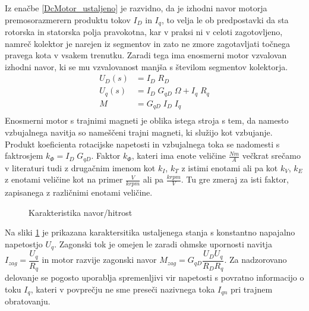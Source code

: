 \documentclass[a4paper,twoside,openright,12pt]{book}
\begin{document}
Iz enačbe \ref{DcMotor_ustaljeno} je razvidno, da je izhodni navor motorja premosorazmerern produktu tokov $I_D$ in $I_q$, to velja le ob predpostavki da sta rotorska in statorska polja pravokotna, kar v praksi ni v celoti zagotovljeno, namreč kolektor je narejen iz segmentov in zato ne zmore zagotavljati točnega pravega kota v vsakem trenutku. Zaradi tega ima enosmerni motor vzvalovan izhodni navor, ki se mu vzvalovanost manjša s številom segmentov kolektorja.\\
\begin{equation} \label{DcMotor_ustaljeno}
\begin{aligned}
U_D(s) &= I_D\;R_D\\[5pt]
U_q(s) & = I_D\;G_{qD}\;\Omega+I_q\;R_q\\[5pt]
M & = G_{qD}\;I_D\;I_q\\[5pt]
\end{aligned}
\end{equation}
Enosmerni motor s trajnimi  magneti je oblika istega stroja s tem, da namesto vzbujalnega navitja so nameščeni trajni magneti, ki služijo kot vzbujanje. Produkt koeficienta rotacijske napetosti in vzbujalnega toka se nadomesti s faktrosjem $k_\Phi= I_D\;G_{qD}$.
Faktor $k_\Phi$, kateri ima enote veličine $\frac{Nm}{A}$ večkrat srečamo v literaturi tudi z drugačnim imenom kot $k_I$, $k_T$ z istimi enotami ali pa kot $k_V$, $k_E$ z enotami veličine kot na primer $\frac{V}{krpm}$ ali pa $\frac{krpm}{V}$. Tu gre zmeraj za isti faktor, zapisanega z različnimi enotami veličine.\\
\begin{figure}[h]
	\centering
		\caption{\label{DcMotor_karaktersitika}Karakteristika navor/hitrost}
\end{figure}	
Na sliki \ref{DcMotor_karaktersitika} je prikazana karaktersitika ustaljenega stanja s konstantno napajalno napetostjo $U_q$. Zagonski tok je omejen le zaradi ohmske upornosti navitja $I_{zag}=\dfrac{U_q}{R_q}$ in motor razvije zagonski navor $M_{zag}=G_{qD}\dfrac{U_DU_q}{R_DR_q}$. Za nadzorovano delovanje se pogosto uporablja spremenljivi vir napetosti s povratno informacijo o toku $I_q$, kateri v povprečju ne sme preseči nazivnega toka $I_{qn}$ pri trajnem obratovanju.
\end{document}
